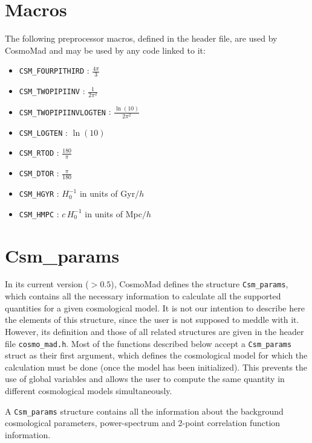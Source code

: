 \documentclass[a4paper,10pt]{article}
\newcommand{\macr}[1]{{\tt \textcolor{BrickRed}{#1}}}
\begin{document}
\section{Macros}

The following preprocessor macros, defined in the header file, are used
by CosmoMad and may be used by any code linked to it:
\begin{itemize}
 \item \macr{CSM\_FOURPITHIRD} : $\frac{4\pi}{3}$
 \item \macr{CSM\_TWOPIPIINV} : $\frac{1}{2\pi^2}$
 \item \macr{CSM\_TWOPIPIINVLOGTEN} : $\frac{\ln(10)}{2\pi^2}$
 \item \macr{CSM\_LOGTEN} : $\ln(10)$
 \item \macr{CSM\_RTOD} : $\frac{180}{\pi}$
 \item \macr{CSM\_DTOR} : $\frac{\pi}{180}$
 \item \macr{CSM\_HGYR} : $H_0^{-1}$ in units of Gyr$/h$
 \item \macr{CSM\_HMPC} : $c\,H_0^{-1}$ in units of Mpc$/h$
\end{itemize}

\section{Csm\_params}

In its current version ($>0.5$), CosmoMad defines the structure
{\tt Csm\_params}, which contains all the necessary information to
calculate all the supported quantities for a given cosmological 
model. It is not our intention to describe here the elements of
this structure, since the user is not supposed to meddle with it.
However, its definition and those of all related structures are
given in the header file {\tt cosmo\_mad.h}. Most of the functions
described below accept a {\tt Csm\_params} struct as their first
argument, which defines the cosmological model for which the 
calculation must be done (once the model has been initialized).
This prevents the use of global variables and allows the user to
compute the same quantity in different cosmological models
simultaneously.

A {\tt Csm\_params} structure contains all the information about
the background cosmological parameters, power-spectrum and 2-point
correlation function information.
\end{document}

